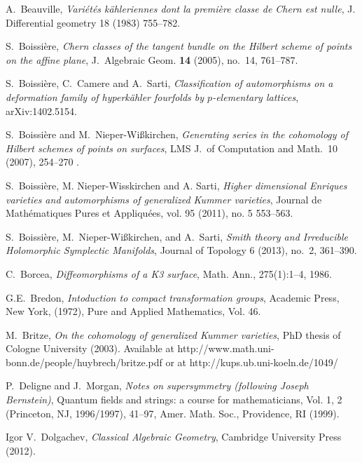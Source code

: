 
\begin{thebibliography}{10}

A.~Beauville, \emph{Vari\'et\'es k\"ahleriennes dont la premi\`ere classe de Chern est nulle}, 
  J. Differential geometry 18 (1983) 755--782.

S.~Boissi\`ere, \emph{Chern classes of the tangent bundle on the Hilbert scheme of points
  on the affine plane}, J.~Algebraic Geom. \textbf{14} (2005), no.~14, 761--787.

S.~Boissi\`ere, C.~Camere and A.~Sarti, \emph{Classification of automorphisms on a deformation family of hyperk\"ahler
fourfolds by $p$-elementary lattices}, arXiv:1402.5154.

S.~Boissi\`ere and M.~Nieper-Wi{\ss}kirchen, \emph{Generating series in the cohomology 
  of Hilbert schemes of points on surfaces}, LMS J.~of Computation and Math.~10 (2007), 254--270 .

S.~Boissi\`ere, M. Nieper-Wisskirchen and A. Sarti, 
\emph{Higher dimensional Enriques varieties and automorphisms of generalized Kummer varieties},
Journal de Math\'ematiques Pures et Appliqu\'ees,
vol. 95 (2011), no. 5 553--563.

S.~Boissi\`ere, M.~Nieper-Wi{\ss}kirchen, and A.~Sarti, \emph{Smith theory and 
  Irreducible Holomorphic Symplectic Manifolds}, Journal of Topology 6 (2013), no.~2, 361--390.

C.~Borcea,
\emph{Diffeomorphisms of a K3 surface},
Math. Ann., 275(1):1--4, 1986.

G.E.~Bredon,
\newblock \emph{Intoduction to compact transformation groups},
Academic Press, New York,
(1972), Pure and Applied Mathematics, Vol. 46.

M.~Britze, \emph{On the cohomology of generalized Kummer varieties}, PhD thesis of Cologne University (2003). 
Available at http://www.math.uni-bonn.de/people/huybrech/britze.pdf or at http://kups.ub.uni-koeln.de/1049/

P.~Deligne and J.~Morgan, \emph{Notes on supersymmetry (following Joseph Bernstein)}, Quantum
fields and strings: a course for mathematicians, Vol. 1, 2 (Princeton, NJ, 1996/1997), 41--97,
Amer. Math. Soc., Providence, RI (1999).

Igor V.~Dolgachev, \emph{Classical Algebraic Geometry}, 
  Cambridge University Press (2012).


\end{thebibliography}
